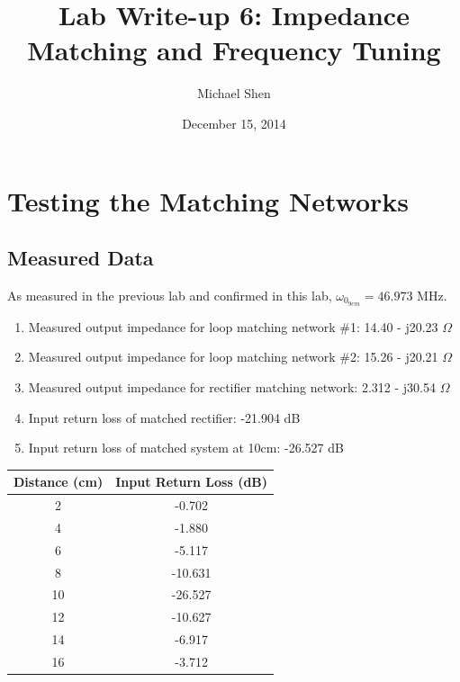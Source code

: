 \documentclass{article}
\begin{document}
\title{Lab Write-up 6: Impedance Matching and Frequency Tuning}
\author{Michael Shen}
\date{December 15, 2014}
\maketitle


\section{Testing the Matching Networks}

\subsection{Measured Data}
As measured in the previous lab and confirmed in this lab, $\omega_{0_{9cm}} = 46.973$ MHz.

\begin{enumerate}
	\item Measured output impedance for loop matching network \#1: 14.40 - j20.23 $\Omega$
	\item Measured output impedance for loop matching network \#2: 15.26 - j20.21 $\Omega$
	\item Measured output impedance for rectifier matching network: 2.312 - j30.54 $\Omega$
	\item Input return loss of matched rectifier: -21.904 dB
	\item Input return loss of matched system at 10cm: -26.527 dB
\end{enumerate}

\begin{table}[H]
\centering
\begin{tabular}{|c|c|}
\hline
Distance (cm) & Input Return Loss (dB) \\ \hline
2             & -0.702                 \\ \hline
4             & -1.880                 \\ \hline
6             & -5.117                 \\ \hline
8             & -10.631                \\ \hline
10            & -26.527                \\ \hline
12            & -10.627                \\ \hline
14            & -6.917                 \\ \hline
16            & -3.712                 \\ \hline
\end{tabular}
\end{table}
\end{document}
